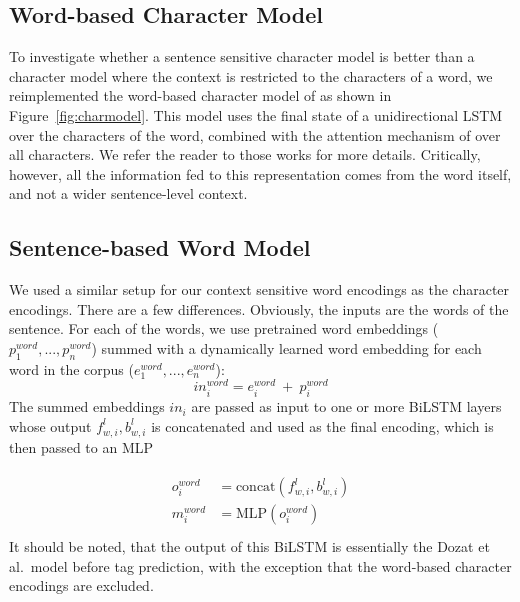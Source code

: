\documentclass[11pt,a4paper]{article}
\begin{document}
\subsection{Word-based Character Model}
\label{sec:word-based}

To investigate whether a sentence sensitive character model is better than a character model where the context is restricted to the characters of a word, we reimplemented the word-based character model of  as shown in  Figure~\ref{fig:charmodel}. This model uses the final state of a unidirectional LSTM over the characters of the word, combined with the attention mechanism of  over all characters. We refer the reader to those works for more details. Critically, however, all the information fed to this representation comes from the word itself, and not a wider sentence-level context.



\subsection{Sentence-based Word Model}
\label{sec:word-model}

We used a similar setup for our context sensitive word encodings as the character encodings. There are a few differences. Obviously, the inputs are the words of the sentence. For each of the words, we use pretrained word embeddings ($p_1^{word}, ..., p_n^{word}$) summed with a dynamically learned word embedding for each word in the corpus ($e_1^{word}, ..., e_n^{word}$):
\[in_i^{word} = e_i^{word}~+~p_i^{word}\]
The summed embeddings $in_i$ are passed as input to one or more BiLSTM layers whose output $f_{w,i}^l, b_{w,i}^l$ is concatenated and used as the final encoding, which is then passed to an MLP 

\begin{eqnarray}
\nonumber
\left.\begin{aligned}
o_i^{word} &=\textrm{concat}(f_{w,i}^l, b_{w,i}^l) \\ \nonumber
m_i^{word} &=\textrm{MLP}(o_i^{word}) \label{equation:mlp-word}\\
\end{aligned}\right.
\end{eqnarray}
It should be noted, that the output of this BiLSTM is essentially the Dozat et al.\ model before tag prediction, with the exception that the word-based character encodings are excluded.
\end{document}
